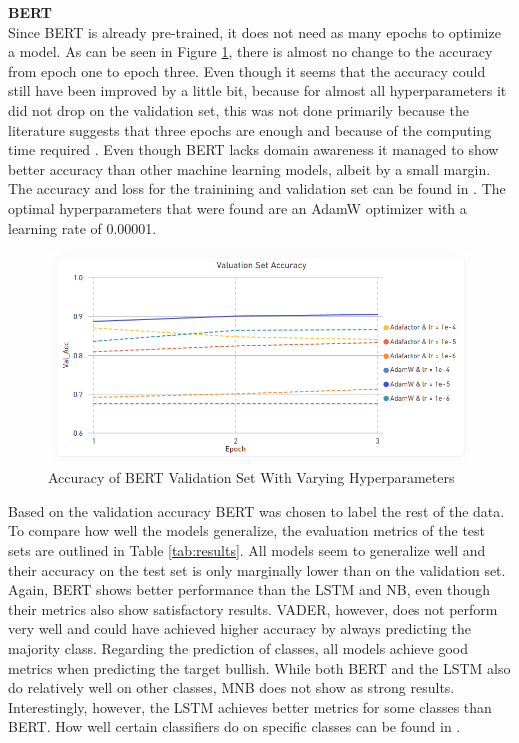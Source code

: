 \documentclass[11pt, a4paper]{article}
\begin{document}
\noindent\textbf{BERT}\\
Since BERT is already pre-trained, it does not need as many epochs to optimize a model.
As can be seen in Figure \ref{fig:Figure BERT_Accuracy_Validation_Set}, there is almost no change to the accuracy from epoch one to epoch three.
Even though it seems that the accuracy could still have been improved by a little bit, because for almost all hyperparameters it did not drop
on the validation set, this was not done primarily because the literature suggests that three epochs are enough and because of the computing time required \citep{lim2020fine}.
Even though BERT lacks domain awareness it managed to show better accuracy than other machine learning models, albeit by a small margin.
The accuracy and loss for the trainining and validation set can be found in .
The optimal hyperparameters that were found are an AdamW optimizer with a learning rate of 0.00001.\\

\begin{figure}[!htb]
    \centering
    \includegraphics[scale=0.55]{BERT_Accuracy_Validation_Set.PNG}
    \caption{Accuracy of BERT Validation Set With Varying Hyperparameters}
    \label{fig:Figure BERT_Accuracy_Validation_Set}
\end{figure}

Based on the validation accuracy BERT was chosen to label the rest of the data.
To compare how well the models generalize, the evaluation metrics of the test sets are outlined in Table \ref{tab:results}.
All models seem to generalize well and their accuracy on the test set is only marginally lower than on the validation set.
Again, BERT shows better performance than the LSTM and NB, even though their metrics also show satisfactory results.
VADER, however, does not perform very well and could have achieved higher accuracy by always predicting the majority class.
Regarding the prediction of classes, all models achieve good metrics when predicting the target bullish.
While both BERT and the LSTM also do relatively well on other classes, MNB does not show as strong results. Interestingly, however, the LSTM achieves better metrics
for some classes than BERT.
How well certain classifiers do on specific classes can be found in .
\end{document}
